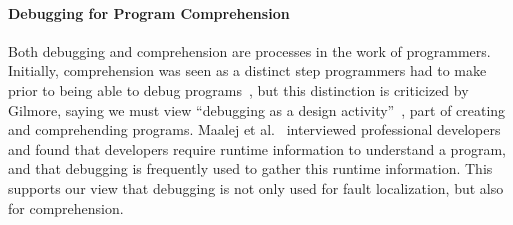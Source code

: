 \paragraph{Debugging for Program Comprehension} Both debugging and
comprehension are processes in the work of programmers.  Initially,
comprehension was seen as a distinct step programmers had to make prior
to being able to debug programs~\cite{katz1987debugging}, but this
distinction is criticized by Gilmore, saying we must view ``debugging as
a design activity''~\cite{gilmore1991models}, part of creating and
comprehending programs.  Maalej et al.~\cite{Maalej2014} interviewed
professional developers and found that developers require runtime
information to understand a program, and that debugging is frequently
used to gather this runtime information.  This supports our view that
debugging is not only used for fault localization, but also for
comprehension.
